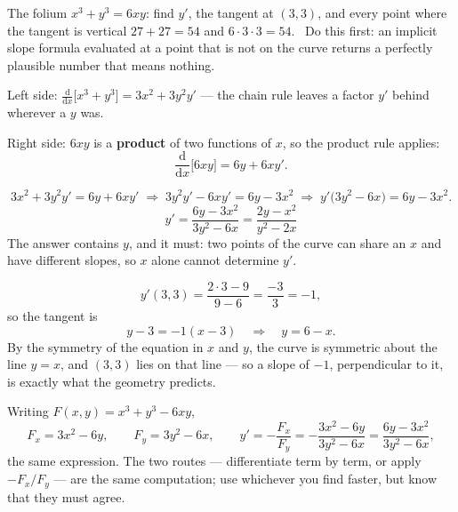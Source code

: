 \begin{worked}{The folium $x^{3}+y^{3}=6xy$: find $y'$, the tangent at $(3,3)$, and every point where the tangent is vertical}
$27+27=54$ and $6\cdot3\cdot3=54$. \checkmark\ Do this first: an implicit
slope formula evaluated at a point that is not on the curve returns a
perfectly plausible number that means nothing.

Left side: $\frac{\mathrm{d}}{\mathrm{d}x}\bigl[x^{3}+y^{3}\bigr]
=3x^{2}+3y^{2}y'$ --- the chain rule leaves a factor $y'$ behind wherever a
$y$ was.

Right side: $6xy$ is a \textbf{product} of two functions of $x$, so the
product rule applies:
\[
  \frac{\mathrm{d}}{\mathrm{d}x}\bigl[6xy\bigr]=6y+6xy' .
\]

\[
  3x^{2}+3y^{2}y'=6y+6xy'
  \;\Longrightarrow\;
  3y^{2}y'-6xy'=6y-3x^{2}
  \;\Longrightarrow\;
  y'\bigl(3y^{2}-6x\bigr)=6y-3x^{2} .
\]
\[
  \boxed{\;y'=\frac{6y-3x^{2}}{3y^{2}-6x}=\frac{2y-x^{2}}{y^{2}-2x}\;}
\]
The answer contains $y$, and it must: two points of the curve can share an
$x$ and have different slopes, so $x$ alone cannot determine $y'$.

\[
  y'(3,3)=\frac{2\cdot3-9}{9-6}=\frac{-3}{3}=-1 ,
\]
so the tangent is
\[
  y-3=-1(x-3)\quad\Longrightarrow\quad y=6-x .
\]
By the symmetry of the equation in $x$ and $y$, the curve is symmetric about
the line $y=x$, and $(3,3)$ lies on that line --- so a slope of $-1$,
perpendicular to it, is exactly what the geometry predicts. \checkmark

Writing $F(x,y)=x^{3}+y^{3}-6xy$,
\[
  F_{x}=3x^{2}-6y,\qquad F_{y}=3y^{2}-6x,
  \qquad
  y'=-\frac{F_{x}}{F_{y}}=-\frac{3x^{2}-6y}{3y^{2}-6x}=\frac{6y-3x^{2}}{3y^{2}-6x},
\]
the same expression. The two routes --- differentiate term by term, or
apply $-F_{x}/F_{y}$ --- are the same computation; use whichever you find
faster, but know that they must agree.


\end{worked}

